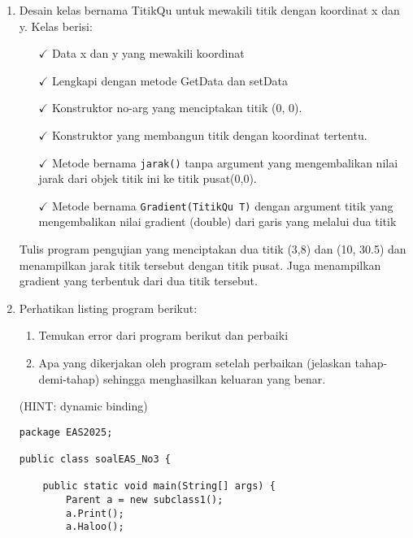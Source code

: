 \documentclass[12pt]{article}
\begin{document}
\begin{enumerate}
    \vspace{0.5cm}

    \item Desain kelas bernama TitikQu untuk mewakili titik dengan koordinat x dan y. Kelas berisi:

    \begin{itemize}
        \item[$\checkmark$] Data x dan y yang mewakili koordinat
        \item[$\checkmark$] Lengkapi dengan metode GetData dan setData
        \item[$\checkmark$] Konstruktor no-arg yang menciptakan titik (0, 0).
        \item[$\checkmark$] Konstruktor yang membangun titik dengan koordinat tertentu.
        \item[$\checkmark$] Metode bernama \texttt{jarak()} tanpa argument yang mengembalikan nilai jarak dari objek titik ini ke titik pusat(0,0).
        \item[$\checkmark$] Metode bernama \texttt{Gradient(TitikQu T)} dengan argument titik yang mengembalikan nilai gradient (double) dari garis yang melalui dua titik
    \end{itemize}

    Tulis program pengujian yang menciptakan dua titik (3,8) dan (10, 30.5) dan menampilkan jarak titik tersebut dengan titik pusat. Juga menampilkan gradient yang terbentuk dari dua titik tersebut.

    \vspace{0.5cm}

    \item Perhatikan listing program berikut:

    \begin{enumerate}[label=\alph*.]
        \item Temukan error dari program berikut dan perbaiki
        \item Apa yang dikerjakan oleh program setelah perbaikan (jelaskan tahap-demi-tahap) sehingga menghasilkan keluaran yang benar.
    \end{enumerate}

    (HINT: dynamic binding)

    \begin{lstlisting}
package EAS2025;

public class soalEAS_No3 {

    public static void main(String[] args) {
        Parent a = new subclass1();
        a.Print();
        a.Haloo();
        

\end{lstlisting}
\end{enumerate}
\end{document}
